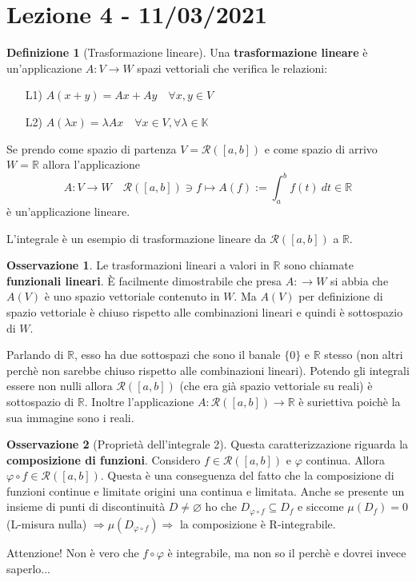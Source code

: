 \documentclass{article}
\theoremstyle{definition}
\theoremstyle{definition}
\theoremstyle{definition}
\newtheorem{definition}{Definizione}[section]
\theoremstyle{definition}
\newtheorem{remark}{Osservazione}[section]
\theoremstyle{definition}
\theoremstyle{definition}
\begin{document}
\newpage
\section{Lezione 4 - 11/03/2021}

\begin{definition}[Trasformazione lineare] 
    Una \textbf{trasformazione lineare} è un'applicazione $A:V\rightarrow W$ spazi vettoriali che verifica le relazioni:
    \begin{enumerate}
        \item [L1)] $A(x+y) = Ax+Ay \quad \forall x,y \in V$
        \item [L2)] $A(\lambda x)=\lambda A x \quad \forall x \in V, \forall \lambda \in \mathbb{K}$
    \end{enumerate}

    Se prendo come spazio di partenza $V=\mathcal{R}([a,b])$ e come spazio di arrivo $W=\mathbb{R}$ allora l'applicazione 
    \[
        A:V\rightarrow W \quad \mathcal{R}([a,b]) \ni f \mapsto A(f) := \int_{a}^{b}f(t) \: dt \in \mathbb{R}
    \]
    è un'applicazione lineare.

    L'integrale è un esempio di trasformazione lineare da $\mathcal{R}([a,b])$ a $\mathbb{R}$.
\end{definition}

\begin{remark}
    Le trasformazioni lineari a valori in $\mathbb{R}$ sono chiamate \textbf{funzionali lineari}. È facilmente dimostrabile che presa $A: \rightarrow W$ si abbia che $A(V)$ è uno spazio vettoriale contenuto in $W$. Ma $A(V)$ per definizione di spazio vettoriale è chiuso rispetto alle combinazioni lineari e quindi è sottospazio di $W$. 
    
    Parlando di $\mathbb{R}$, esso ha due sottospazi che sono il banale $\lbrace 0 \rbrace$ e $\mathbb{R}$ stesso (non altri perchè non sarebbe chiuso rispetto alle combinazioni lineari). Potendo gli integrali essere non nulli allora $\mathcal{R}([a,b])$ (che era già spazio vettoriale su reali) è sottospazio di $\mathbb{R}$.
    Inoltre l'applicazione $A:\mathcal{R}([a,b])\rightarrow \mathbb{R}$ è suriettiva poichè la sua immagine sono i reali.

\end{remark}

\begin{remark}[Proprietà dell'integrale 2]
    Questa caratterizzazione riguarda la \textbf{composizione di funzioni}. Considero $f\in\mathcal{R}([a,b])$ e $\varphi$ continua. Allora $\varphi \circ f \in \mathcal{R}([a,b])$. Questa è una conseguenza del fatto che la composizione di funzioni continue e limitate origini una continua e limitata. Anche se presente un insieme di punti di discontinuità $D\neq \varnothing$ ho che $D_{\varphi \circ f} \subseteq D_f$ e siccome $\mu(D_f)=0$ (L-misura nulla) $\Rightarrow \mu(D_{\varphi\circ f}) \Rightarrow$ la composizione è R-integrabile.

    Attenzione! Non è vero che $f\circ\varphi$ è integrabile, ma non so il perchè e dovrei invece saperlo...
\end{remark}
\end{document}
